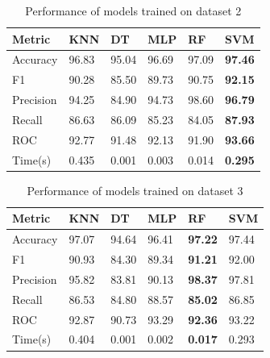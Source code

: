 \begin{table}[hbt]
\caption{Performance of models trained on dataset 2} \label{tab:performance_of_models_trained_on_dataset_2}
\begin{tabular*}{\tblwidth}{@{}LLLLLL@{}}
    \toprule
    Metric & KNN & DT & MLP & RF & \textbf{SVM} \\
    \midrule
    Accuracy & 96.83 & 95.04 & 96.69 & 97.09 & \textbf{97.46} \\
    F1 & 90.28 & 85.50 & 89.73 & 90.75 & \textbf{92.15} \\
    Precision & 94.25 & 84.90 & 94.73 & 98.60 & \textbf{96.79} \\
    Recall & 86.63 & 86.09 & 85.23 & 84.05 & \textbf{87.93} \\
    ROC & 92.77 & 91.48 & 92.13 & 91.90 & \textbf{93.66} \\
    Time(s) & 0.435 & 0.001 & 0.003 & 0.014 & \textbf{0.295} \\
    \bottomrule
\end{tabular*}
\end{table}

\begin{table}[hbt]
\caption{Performance of models trained on dataset 3} \label{tab:performance_of_models_trained_on_dataset_3}
\begin{tabular*}{\tblwidth}{@{}LLLLLL@{}}
    \toprule
    Metric & KNN & DT & MLP & \textbf{RF} & SVM \\
    \midrule
    Accuracy & 97.07 & 94.64 & 96.41 & \textbf{97.22} & 97.44 \\
    F1 & 90.93 & 84.30 & 89.34 & \textbf{91.21} & 92.00 \\
    Precision & 95.82 & 83.81 & 90.13 & \textbf{98.37} & 97.81 \\
    Recall & 86.53 & 84.80 & 88.57 & \textbf{85.02} & 86.85 \\
    ROC & 92.87 & 90.73 & 93.29 & \textbf{92.36} & 93.22 \\
    Time(s) & 0.404 & 0.001 & 0.002 & \textbf{0.017} & 0.293 \\
    \bottomrule
\end{tabular*}
\end{table}

